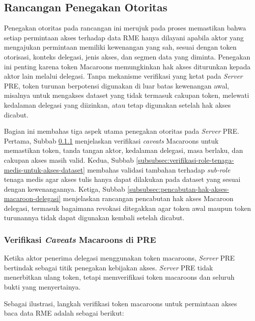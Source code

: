 \subsection{Rancangan Penegakan Otoritas}
\label{subsec:rancangan-penegakan-otoritas}

Penegakan otoritas pada rancangan ini merujuk pada proses memastikan bahwa setiap permintaan akses terhadap data RME hanya dilayani apabila aktor yang mengajukan permintaan memiliki kewenangan yang sah, sesuai dengan token otorisasi, konteks delegasi, jenis akses, dan segmen data yang diminta. Penegakan ini penting karena token Macaroons memungkinkan hak akses diturunkan kepada aktor lain melalui delegasi. Tanpa mekanisme verifikasi yang ketat pada \textit{Server} PRE, token turunan berpotensi digunakan di luar batas kewenangan awal, misalnya untuk mengakses dataset yang tidak termasuk cakupan token, melewati kedalaman delegasi yang diizinkan, atau tetap digunakan setelah hak akses dicabut.

Bagian ini membahas tiga aspek utama penegakan otoritas pada \textit{Server} PRE. Pertama, Subbab \ref{subsubsec:verifikasi-caveats-macaroons-di-pre} menjelaskan verifikasi \textit{caveats} Macaroons untuk memastikan token, tanda tangan aktor, kedalaman delegasi, masa berlaku, dan cakupan akses masih valid. Kedua, Subbab \ref{subsubsec:verifikasi-role-tenaga-medis-untuk-akses-dataset} membahas validasi tambahan terhadap \textit{sub-role} tenaga medis agar akses tulis hanya dapat dilakukan pada dataset yang sesuai dengan kewenangannya. Ketiga, Subbab \ref{subsubsec:pencabutan-hak-akses-macaroon-delegasi} menjelaskan rancangan pencabutan hak akses Macaroon delegasi, termasuk bagaimana revokasi ditegakkan agar token awal maupun token turunannya tidak dapat digunakan kembali setelah dicabut.

\subsubsection{Verifikasi \textit{Caveats} Macaroons di PRE}
\label{subsubsec:verifikasi-caveats-macaroons-di-pre}

Ketika aktor penerima delegasi menggunakan token macaroons, \textit{Server} PRE bertindak sebagai titik penegakan kebijakan akses. \textit{Server} PRE tidak menerbitkan ulang token, tetapi memverifikasi token macaroons dan seluruh bukti yang menyertainya.

Sebagai ilustrasi, langkah verifikasi token macaroons untuk permintaan akses baca data RME adalah sebagai berikut:

